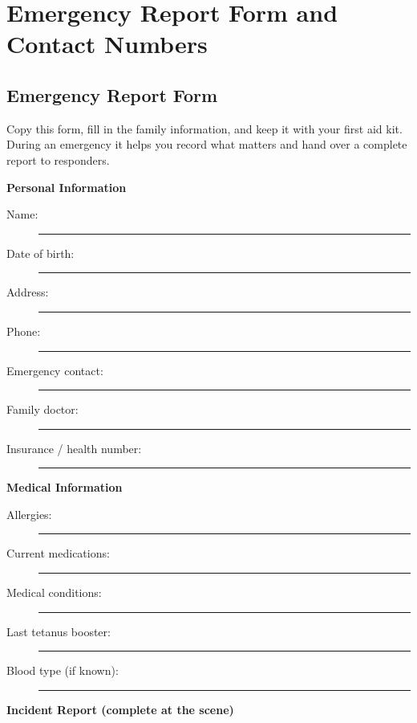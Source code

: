 \chapter{Emergency Report Form and Contact Numbers}\label{ch:emergency_forms}

\section{Emergency Report Form}

Copy this form, fill in the family information, and keep it with your first aid kit. During an emergency it helps you record what matters and hand over a complete report to responders.

\textbf{Personal Information}

\begin{description}
  \item[Name:] \rule{0.6\textwidth}{0.4pt}
  \item[Date of birth:] \rule{0.55\textwidth}{0.4pt}
  \item[Address:] \rule{0.58\textwidth}{0.4pt}
  \item[Phone:] \rule{0.6\textwidth}{0.4pt}
  \item[Emergency contact:] \rule{0.42\textwidth}{0.4pt}
  \item[Family doctor:] \rule{0.5\textwidth}{0.4pt}
  \item[Insurance / health number:] \rule{0.35\textwidth}{0.4pt}
\end{description}

\textbf{Medical Information}

\begin{description}
  \item[Allergies:] \rule{0.7\textwidth}{0.4pt}
  \item[Current medications:] \rule{0.52\textwidth}{0.4pt}
  \item[Medical conditions:] \rule{0.55\textwidth}{0.4pt}
  \item[Last tetanus booster:] \rule{0.48\textwidth}{0.4pt}
  \item[Blood type (if known):] \rule{0.45\textwidth}{0.4pt}
\end{description}

\textbf{Incident Report (complete at the scene)}

